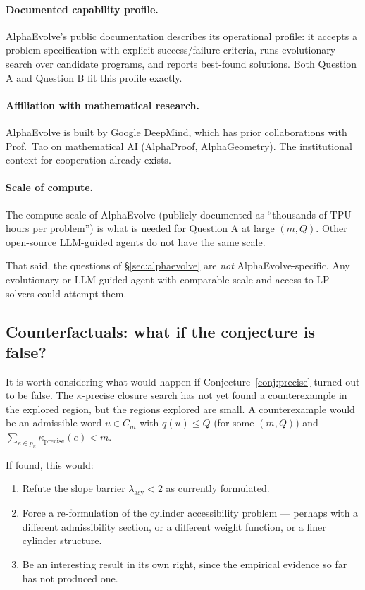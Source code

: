 \documentclass[11pt,a4paper]{article}
\theoremstyle{plain}
\theoremstyle{definition}
\begin{document}
\paragraph{Documented capability profile.}
AlphaEvolve's public documentation describes its operational
profile: it accepts a problem specification with explicit
success/failure criteria, runs evolutionary search over candidate
programs, and reports best-found solutions. Both Question A and
Question B fit this profile exactly.

\paragraph{Affiliation with mathematical research.}
AlphaEvolve is built by Google DeepMind, which has prior
collaborations with Prof.\ Tao on mathematical AI (AlphaProof,
AlphaGeometry). The institutional context for cooperation already
exists.

\paragraph{Scale of compute.}
The compute scale of AlphaEvolve (publicly documented as
``thousands of TPU-hours per problem'') is what is needed for
Question A at large $(m, Q)$. Other open-source LLM-guided
agents do not have the same scale.

That said, the questions of \S\ref{sec:alphaevolve} are
\emph{not} AlphaEvolve-specific. Any evolutionary or LLM-guided
agent with comparable scale and access to LP solvers could
attempt them.

\subsection{Counterfactuals: what if the conjecture is false?}

It is worth considering what would happen if
Conjecture~\ref{conj:precise} turned out to be false. The
$\kappa$-precise closure search has not yet found a counterexample
in the explored region, but the regions explored are small. A
counterexample would be an admissible word $u \in C_m$ with
$q(u) \le Q$ (for some $(m, Q)$) and
$\sum_{e \in p_u} \kappa_{\mathrm{precise}}(e) < m$.

If found, this would:
\begin{enumerate}
   \item Refute the slope barrier
         $\lambda_{\mathrm{asy}} < 2$ as currently formulated.
   \item Force a re-formulation of the cylinder accessibility
         problem — perhaps with a different admissibility section,
         or a different weight function, or a finer cylinder
         structure.
   \item Be an interesting result in its own right, since the
         empirical evidence so far has not produced one.
\end{enumerate}
\end{document}
